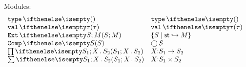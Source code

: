 \documentclass[11pt,twoside]{article}
\begin{document}
Modules:
\begin{displaymath}
  \begin{array}{l@{\quad}l@{\quad}l}
    \univsg  & \univsg* \\
    \valmod{\tau} & \valmod*{\tau} \\
    \extsg{S}{M} & \extsg*{S}{M} \\
    \compsg{S}  & \compsg*{S} \\
    \pisg{S_1}{X}{S_2} & \pisg*{S_1}{X}{S_2} \\
    \sigsg{S_1}{X}{S_2} & \sigsg*{S_1}{X}{S_2}
  \end{array}
\end{displaymath}
\end{document}
